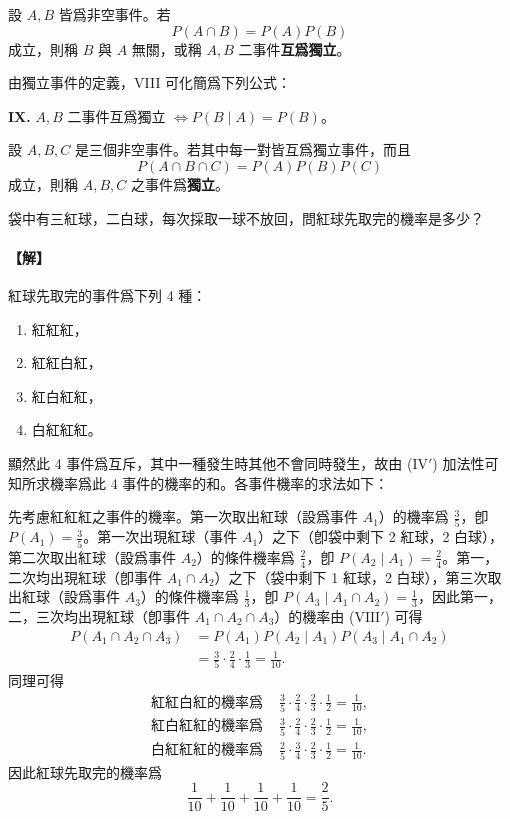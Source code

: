\medskip
\begin{definition*}
設 $A, B$ 皆爲非空事件。若
\[
P(A \cap B) = P(A) P(B)
\]
成立，則稱 $B$ 與 $A$ 無關，或稱 $A, B$ 二事件\textbf{互爲獨立}。
\end{definition*}

由獨立事件的定義，VIII 可化簡爲下列公式：

\medskip
\noindent\textbf{IX.} $A, B$ 二事件互爲獨立 $\Longleftrightarrow P(B \mid A) = P(B)$。

\medskip
\begin{definition*}
設 $A, B, C$ 是三個非空事件。若其中每一對皆互爲獨立事件，而且
\[
P(A \cap B \cap C) = P(A) P(B) P(C)
\]
成立，則稱 $A, B, C$ 之事件爲\textbf{獨立}。
\end{definition*}

\medskip
\begin{discussion}\label{disc:b5s-3-3}
袋中有三紅球，二白球，每次採取一球不放回，問紅球先取完的機率是多少？
\end{discussion}
\paragraph{【解】}
紅球先取完的事件爲下列 4 種：
\begin{enumerate}[1.]
  \item 紅紅紅，
  \item 紅紅白紅，
  \item 紅白紅紅，
  \item 白紅紅紅。
\end{enumerate}
顯然此 4 事件爲互斥，其中一種發生時其他不會同時發生，故由 ($\text{IV}'$) 加法性可知所求機率爲此 4 事件的機率的和。各事件機率的求法如下：

先考慮紅紅紅之事件的機率。第一次取出紅球（設爲事件 $A_1$）的機率爲 $\frac{3}{5}$，卽 $P(A_1) = \frac{3}{5}$。第一次出現紅球（事件 $A_1$）之下（卽袋中剩下 2 紅球，2 白球），第二次取出紅球（設爲事件 $A_2$）的條件機率爲 $\frac{2}{4}$，卽 $P(A_2 \mid A_1) = \frac{2}{4}$。第一，二次均出現紅球（卽事件 $A_1 \cap A_2$）之下（袋中剩下 1 紅球，2 白球），第三次取出紅球（設爲事件 $A_3$）的條件機率爲 $\frac{1}{3}$，卽 $P(A_3 \mid A_1 \cap A_2) = \frac{1}{3}$，因此第一，二，三次均出現紅球（卽事件 $A_1 \cap A_2 \cap A_3$）的機率由 ($\text{VIII}'$) 可得
\begin{align*}
P(A_1 \cap A_2 \cap A_3) &= P(A_1) P(A_2 \mid A_1) P(A_3 \mid A_1 \cap A_2) \\
&= \frac{3}{5} \cdot \frac{2}{4} \cdot \frac{1}{3} = \frac{1}{10}.
\end{align*}
同理可得
\begin{align*}
\text{紅紅白紅的機率爲 } &\frac{3}{5} \cdot \frac{2}{4} \cdot \frac{2}{3} \cdot \frac{1}{2} = \frac{1}{10}, \\
\text{紅白紅紅的機率爲 } &\frac{3}{5} \cdot \frac{2}{4} \cdot \frac{2}{3} \cdot \frac{1}{2} = \frac{1}{10}, \\
\text{白紅紅紅的機率爲 } &\frac{2}{5} \cdot \frac{3}{4} \cdot \frac{2}{3} \cdot \frac{1}{2} = \frac{1}{10}.
\end{align*}
因此紅球先取完的機率爲
\[
\frac{1}{10} + \frac{1}{10} + \frac{1}{10} + \frac{1}{10} = \frac{2}{5}.
\]

